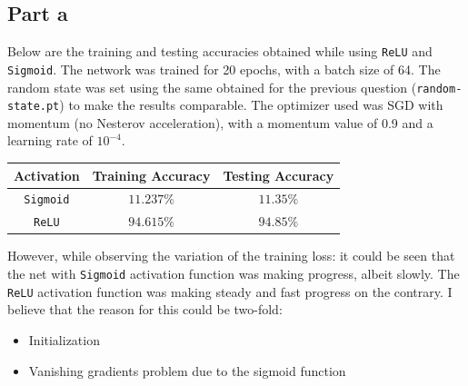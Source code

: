 \documentclass{article}
\begin{document}
\subsection*{Part a}
\begin{flushleft}
Below are the training and testing accuracies obtained while using \texttt{ReLU} and \texttt{Sigmoid}. The network was trained for 20 epochs, with a batch size of 64. The random state was set using the same obtained for the previous question (\texttt{random-state.pt}) to make the results comparable. The optimizer used was SGD with momentum (no Nesterov acceleration), with a momentum value of 0.9 and a learning rate of \(10^{-4}\).
\begin{center}
\begin{tabular}{|c|c|c|}
\hline
Activation & Training Accuracy & Testing Accuracy \\
\hline
\hline
\texttt{Sigmoid} & \(11.237\%\)& \(11.35\%\)\\
\hline
\texttt{ReLU} & \(94.615\%\) & \(94.85\%\)\\
\hline
\end{tabular}
\end{center}

However, while observing the variation of the training loss: it could be seen that the net with \texttt{Sigmoid} activation function was making progress, albeit slowly. The \texttt{ReLU} activation function was making steady and fast progress on the contrary. I believe that the reason for this could be two-fold:
\begin{itemize}
\item Initialization
\item Vanishing gradients problem due to the sigmoid function
\end{itemize}


\end{flushleft}
\end{document}
